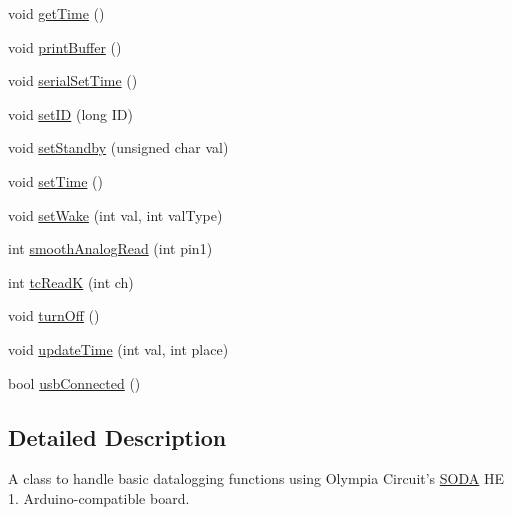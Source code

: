 \begin{DoxyCompactItemize}
\item 
void \hyperlink{class_s_o_d_a_a126e337a85ae2ff4380d738d8d55ed64}{get\-Time} ()
\item 
void \hyperlink{class_s_o_d_a_af1e78fa91c8cb363a93320acaacf0e7f}{print\-Buffer} ()
\item 
void \hyperlink{class_s_o_d_a_abac684bb54a9d346337b6e0ed9243e40}{serial\-Set\-Time} ()
\item 
void \hyperlink{class_s_o_d_a_aa79b275be71dbfd5662608add4715b87}{set\-I\-D} (long I\-D)
\item 
void \hyperlink{class_s_o_d_a_aa78eec946be2a371ae844fa44f6e4d96}{set\-Standby} (unsigned char val)
\item 
void \hyperlink{class_s_o_d_a_a69b626b4dfd0847a1d9452ce8faba28e}{set\-Time} ()
\item 
void \hyperlink{class_s_o_d_a_a6acf21ab1e6db2b8861715e8a5a7f37f}{set\-Wake} (int val, int val\-Type)
\item 
int \hyperlink{class_s_o_d_a_a55eaa23fbeb729b6d348a0d6c4e3c9b3}{smooth\-Analog\-Read} (int pin1)
\item 
int \hyperlink{class_s_o_d_a_a1f1aa095370775ed2d94ca6d842ff213}{tc\-Read\-K} (int ch)
\item 
void \hyperlink{class_s_o_d_a_a135382c3d907496f74c852965b31ffdd}{turn\-Off} ()
\item 
void \hyperlink{class_s_o_d_a_a17bd73a287665e022f8e955db65618b8}{update\-Time} (int val, int place)
\item 
bool \hyperlink{class_s_o_d_a_a5ef9772aba25fe5b19bc0d647d8c899a}{usb\-Connected} ()
\end{DoxyCompactItemize}


\subsection{Detailed Description}
A class to handle basic datalogging functions using Olympia Circuit's \hyperlink{class_s_o_d_a}{S\-O\-D\-A} H\-E 1. Arduino-\/compatible board. 

